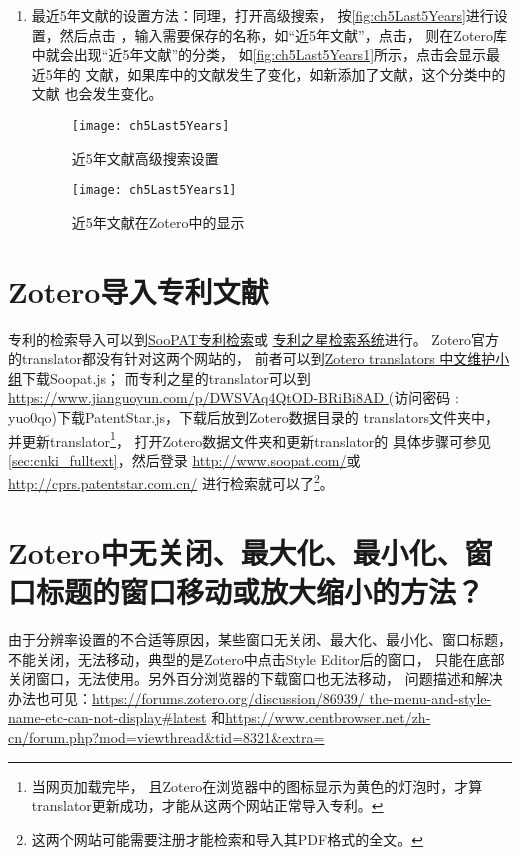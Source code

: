\documentclass[cn,11pt,chinese]{elegantbook}
\begin{document}
\begin{enumerate}
					\item 最近5年文献的设置方法：同理，打开高级搜索，
					按\autoref{fig:ch5Last5Years}进行设置，然后点击
					，输入需要保存的名称，如“近5年文献”，点击，
					 则在Zotero库中就会出现“近5年文献”的分类，
					 如\autoref{fig:ch5Last5Years1}所示，点击会显示最近5年的
					 文献，如果库中的文献发生了变化，如新添加了文献，这个分类中的文献
					 也会发生变化。
							\begin{figure}[ht]
								\centering
								\texttt{[image: ch5Last5Years]}
								\caption{近5年文献高级搜索设置}
								\label{fig:ch5Last5Years}
							\end{figure}
						\begin{figure}[ht]
							\centering
							\texttt{[image: ch5Last5Years1]}
							\caption{近5年文献在Zotero中的显示}
							\label{fig:ch5Last5Years1}
						\end{figure}		
				\end{enumerate}


		
		\section{Zotero导入专利文献}\label{sec:Patent}
			专利的检索导入可以到\href{http://www.soopat.com/}{SooPAT专利检索}或
			\href{http://cprs.patentstar.com.cn/}{专利之星检索系统}进行。
			Zotero官方的translator都没有针对这两个网站的，
			前者可以到\href{https://github.com/l0o0/translators_CN}
			{Zotero translators 中文维护小组}下载Soopat.js；
			而专利之星的translator可以到\url{https://www.jianguoyun.com/p/DWSVAq4QtOD-BRiBi8AD
			} (访问密码 : yuo0qo)下载PatentStar.js，下载后放到Zotero数据目录的
			translators文件夹中，并更新translator\footnote{当网页加载完毕，
			且Zotero在浏览器中的图标显示为黄色的灯泡时，才算translator更新成功，才能从这两个网站正常导入专利。}，
			打开Zotero数据文件夹和更新translator的
			具体步骤可参见\cref{sec:cnki_fulltext}，然后登录
			\url{http://www.soopat.com/}或\url{http://cprs.patentstar.com.cn/}
			进行检索就可以了\footnote{这两个网站可能需要注册才能检索和导入其PDF格式的全文。}。
		
	\section{Zotero中无关闭、最大化、最小化、窗口标题的窗口移动或放大缩小的方法？}\label{sec:no_max}	
			由于分辨率设置的不合适等原因，某些窗口无关闭、最大化、最小化、窗口标题，
			不能关闭，无法移动，典型的是Zotero中点击Style Editor后的窗口，
			只能在底部关闭窗口，无法使用。另外百分浏览器的下载窗口也无法移动，
			问题描述和解决办法也可见：\url{https://forums.zotero.org/discussion/86939/
			the-menu-and-style-name-etc-can-not-display#latest}
			和\url{https://www.centbrowser.net/zh-cn/forum.php?mod=viewthread&tid=8321&extra=}
			
\end{document}
